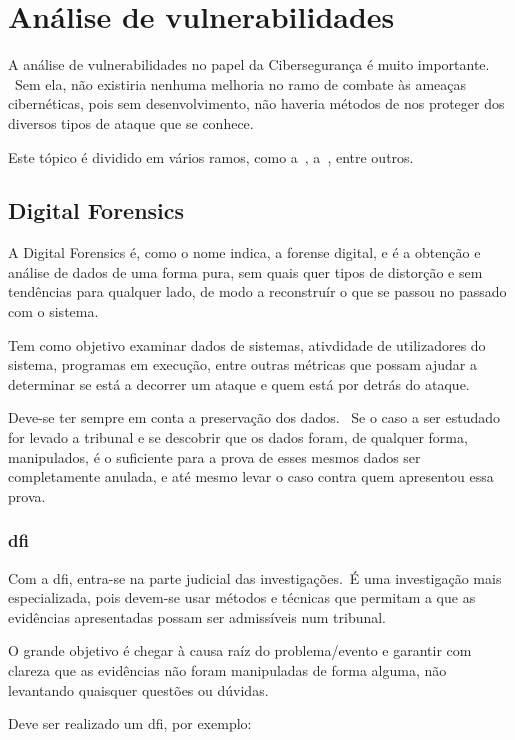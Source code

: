 \documentclass{report}
\begin{document}
\section{Análise de vulnerabilidades}
\label{sec:analise-de-vulnerabilidades}
A análise de vulnerabilidades no papel da Cibersegurança é muito importante. \ Sem ela, não existiria nenhuma melhoria no ramo de combate às ameaças cibernéticas, pois sem desenvolvimento, não haveria métodos de nos proteger dos diversos tipos de ataque que se conhece. \par
Este tópico é dividido em vários ramos, como a~\textbf{}, a~\textbf{}, entre outros.

\subsection{Digital Forensics}
\label{subsec:digital-forensics}
A Digital Forensics é, como o nome indica, a forense digital, e é a obtenção e análise de dados de uma forma pura, sem quais quer tipos de distorção e sem tendências para qualquer lado, de modo a reconstruír o que se passou no passado com o sistema. \par
Tem como objetivo examinar dados de sistemas, ativdidade de utilizadores do sistema, programas em execução, entre outras métricas que possam ajudar a determinar se está a decorrer um ataque e quem está por detrás do ataque. \par
Deve-se ter sempre em conta a preservação dos dados. \ Se o caso a ser estudado for levado a tribunal e se descobrir que os dados foram, de qualquer forma, manipulados, é o suficiente para a prova de esses mesmos dados ser completamente anulada, e até mesmo levar o caso contra quem apresentou essa prova.

\newpage

\subsubsection{\ac{dfi}}
Com a \ac{dfi}, entra-se na parte judicial das investigações.\ É uma investigação mais especializada, pois devem-se usar métodos e técnicas que permitam a que as evidências apresentadas possam ser admissíveis num tribunal.\par
O grande objetivo é chegar à causa raíz do problema/evento e garantir com clareza que as evidências não foram manipuladas de forma alguma, não levantando quaisquer questões ou dúvidas.\par
Deve ser realizado um \ac{dfi}, por exemplo:
\end{document}
